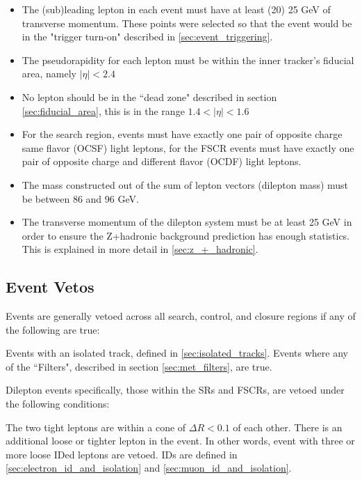     \begin{itemize}
      \item The (sub)leading lepton in each event must have at least (20) 25 GeV of transverse momentum. These points were selected so that the event would be in the "trigger turn-on" described in \ref{sec:event_triggering}.
      \item The pseudorapidity for each lepton must be within the inner tracker's fiducial area, namely $\left|\eta\right| < 2.4$
      \item No lepton should be in the ``dead zone" described in section \ref{sec:fiducial_area}, this is in the range $1.4 < \left|\eta\right| < 1.6$
      \item For the search region, events must have exactly one pair of opposite charge same flavor (OCSF) light leptons, for the FSCR events must have exactly one pair of opposite charge and different flavor (OCDF) light leptons.
      \item The mass constructed out of the sum of lepton vectors (dilepton mass) must be between 86 and 96 GeV.
      \item The transverse momentum of the dilepton system must be at least 25 GeV in order to ensure the Z+hadronic background prediction has enough statistics. This is explained in more detail in \ref{sec:z_+_hadronic}.
    \end{itemize}

  \subsection{Event Vetos}
    Events are generally vetoed across all search, control, and closure regions if any of the following are true:

    \begin{description}
       Events with an isolated track, defined in \ref{sec:isolated_tracks}.
       Events where any of the ``\MET Filters", described in section \ref{sec:met_filters}, are true.
    \end{description}

    Dilepton events specifically, those within the SRs and FSCRs, are vetoed under the following conditions:

      \begin{description}
         The two tight leptons are within a cone of $\Delta R < 0.1$ of each other.
         There is an additional loose or tighter lepton in the event. In other words, event with three or more loose IDed leptons are vetoed. IDs are defined in \ref{sec:electron_id_and_isolation} and \ref{sec:muon_id_and_isolation}. 
      \end{description}

